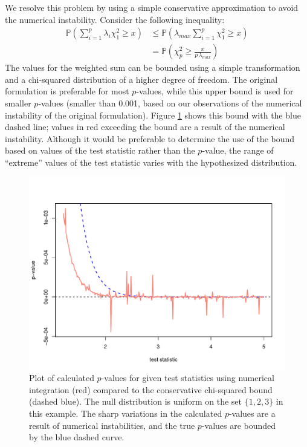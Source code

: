 We resolve this problem by using a simple conservative approximation to
avoid the numerical instability. Consider the
following inequality:
\begin{align}
\mathbb{P} \left(\sum_{i=1}^{p} \lambda_i \chi^2_1 \geq x \right) &\leq \mathbb{P} \left( \lambda_{max} \sum_{i=1}^{p} \chi^2_1 \geq x \right) \label{ineq1} \\
&= \mathbb{P} \left(\chi^2_p \geq \frac{x}{p \, \lambda_{max}} \right)
\label{ineq2}
\end{align}
The values for the weighted sum can be bounded using a simple transformation
and a chi-squared distribution of a higher degree of freedom. 
The original formulation is preferable for most $p$-values, while
this upper bound is used for smaller $p$-values (smaller than 0.001,
based on our observations of the numerical instability of the original
formulation).  Figure \ref{cvmissues} shows this bound with the blue dashed
line; values in red exceeding the bound are a result of the numerical
instability.  Although it would be preferable to determine the use of
the bound based on values of the test statistic rather than the $p$-value,
the range of ``extreme'' values of the test statistic varies with the
hypothesized distribution.



\begin{figure}
\begin{center}
\includegraphics[scale=0.4]{fig1.pdf}
\end{center}
\caption{Plot of calculated $p$-values for given test statistics
using numerical integration
(red) compared to the conservative chi-squared bound (dashed blue). 
The null distribution is uniform on the set $\{1,2,3\}$ in this example.
The sharp variations in the calculated $p$-values are a result of numerical
instabilities, and the true $p$-values are bounded by the blue dashed curve.}
\label{cvmissues}
\end{figure}



